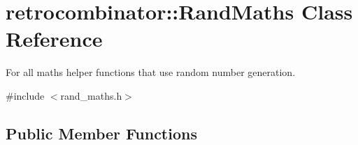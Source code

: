 \hypertarget{classretrocombinator_1_1RandMaths}{}\section{retrocombinator\+:\+:Rand\+Maths Class Reference}
\label{classretrocombinator_1_1RandMaths}


For all maths helper functions that use random number generation.  




{\ttfamily \#include $<$rand\+\_\+maths.\+h$>$}

\subsection*{Public Member Functions}
